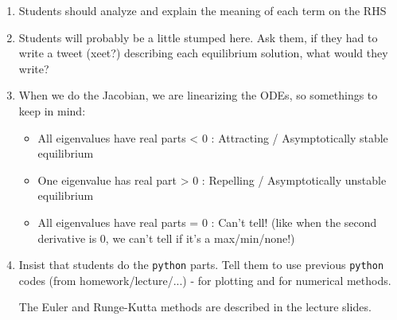 \begin{enumerate}[label=\ref{q1}.(\alph*)]
	\item Students should analyze and explain the meaning of each term on the RHS
	\item Students will probably be a little stumped here. Ask them, if they had to write a tweet (xeet?) describing each equilibrium solution, what would they write?
	\item When we do the Jacobian, we are linearizing the ODEs, so somethings to keep in mind:
	\begin{itemize}
		\item All eigenvalues have real parts < 0 : Attracting / Asymptotically stable equilibrium
		\item One eigenvalue has real part > 0 : Repelling / Asymptotically unstable equilibrium
		\item All eigenvalues have real parts = 0 : Can't tell! (like when the second derivative is 0, we can't tell if it's a max/min/none!)
	\end{itemize}

	
	\item Insist that students do the \verb|python| parts. Tell them to use previous \verb|python| codes (from homework/lecture/...) - for plotting and for numerical methods.
	
	The Euler and Runge-Kutta methods are described in the lecture slides.
	
\end{enumerate}







%
	
	

	
	
